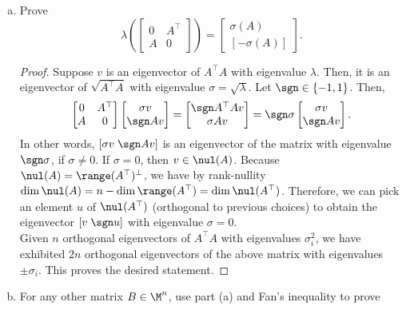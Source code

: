 \documentclass[../borwein-lewis_notes.tex]{subfiles}
\begin{document}
\begin{enumerate}[(a)]
\item Prove 
\begin{equation*}
\lambda\left(\begin{bmatrix} 0 & A^\top \\ A & 0\end{bmatrix}\right) 
= \begin{bmatrix} \sigma(A) \\ [-\sigma(A)]\end{bmatrix}.
\end{equation*}
\begin{proof}
Suppose $v$ is an eigenvector of $A^\top A$ with eigenvalue $\lambda$.
Then, it is an eigenvector of $\sqrt{A^\top A}$ with eigenvalue $\sigma 
= \sqrt{\lambda}$. Let $\sgn\in\{-1,1\}$. Then, 
\begin{equation*}
\begin{bmatrix} 0 & A^\top \\ A & 0\end{bmatrix}\begin{bmatrix}
\sigma v \\ \sgn A v\end{bmatrix} 
= \begin{bmatrix} \sgn A^\top Av \\ \sigma Av\end{bmatrix} 
= \sgn\sigma\begin{bmatrix} \sigma v \\ \sgn Av \end{bmatrix}.
\end{equation*}
In other words, $[\sigma v\; \sgn Av]$ is an eigenvector of the matrix 
with eigenvalue $\sgn\sigma$, if $\sigma\neq 0$. If $\sigma = 0$, 
then $v\in \nul(A)$. Because $\nul(A) = \range(A^\top)^{\perp}$, 
we have by rank-nullity $\dim\nul(A) = n-\dim\range(A^\top) = \dim\nul
(A^\top)$. Therefore, we can pick an element $u$ of $\nul(A^\top)$ 
(orthogonal to previous choices) to obtain the eigenvector 
$[v\; \sgn u]$ with eigenvalue $\sigma=0$. \\
Given $n$ orthogonal eigenvectors of 
$A^\top A$ with eigenvalues $\sigma_i^2$, 
we have exhibited $2n$ orthogonal eigenvectors of the above matrix with 
eigenvalues $\pm\sigma_i$. This proves the desired statement.
\end{proof}
\item For any other matrix $B\in\M^n$, use part (a) and Fan's inequality 
to prove 
\begin{equation*}

\end{equation*}
\end{enumerate}
\end{document}
